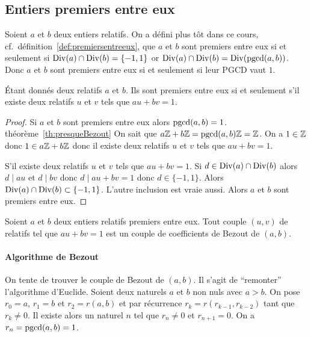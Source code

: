 \subsection{Entiers premiers entre eux}

Soient \(a\) et \(b\) deux entiers relatifs. On a défini plus tôt dans ce cours, 
cf.\ définition~\ref{def:premiersentreeux}, que \(a\) et \(b\) sont premiers entre eux si et 
seulement si \(\operatorname{Div}(a) \cap \operatorname{Div}(b)=\{-1,1\}\) or \(\operatorname{Div}(a) \cap \operatorname{Div}(b) = 
\operatorname{Div}(\operatorname{pgcd}(a,b))\). Donc \(a\) et \(b\) sont premiers entre eux si et seulement 
si leur PGCD vaut \(1\).

\begin{theo}
  Étant donnés deux relatifs \(a\) et \(b\). Ils sont premiers entre eux si et 
  seulement s'il existe deux relatifs \(u\) et \(v\) tels que \(au+bv=1\).
\end{theo}
\begin{proof}
  Si \(a\) et \(b\) sont premiers entre eux alors \(\operatorname{pgcd}(a,b) =1\). %
  théorème~\ref{th:presqueBezout}
  On sait que \(a\mathbb{Z}+b\mathbb{Z}=\operatorname{pgcd}(a,b)\mathbb{Z}=\mathbb{Z}\). On a \(1 \in \mathbb{Z}\) donc \(1 \in 
  a\mathbb{Z}+b\mathbb{Z}\) donc il existe deux relatifs \(u\) et \(v\) tels que \(au+bv=1\).

  S'il existe deux relatifs \(u\) et \(v\) tels que \(au+bv=1\). Si \(d \in 
  \operatorname{Div}(a) \cap \operatorname{Div}(b)\) alors \(d \mid au\) et \(d \mid bv\) donc \(d \mid 
  au+bv=1\) donc \(d \in \{-1,1\}\). Alors \(\operatorname{Div}(a) \cap \operatorname{Div}(b) \subset 
  \{-1,1\}\). L'autre inclusion est vraie aussi. Alors \(a\) et \(b\) sont 
  premiers entre eux.
\end{proof}

\begin{defdef}
  Soient \(a\) et \(b\) deux entiers relatifs premiers entre eux. Tout couple 
  \((u,v)\) de relatifs tel que \(au+bv=1\) est un couple de coefficients de 
  Bezout de \((a,b)\).
\end{defdef}

\paragraph{Algorithme de Bezout}

On tente de trouver le couple de Bezout de \((a,b)\). Il s'agit de ``remonter'' 
l'algorithme d'Euclide. Soient deux naturels \(a\) et \(b\) non nuls avec 
\(a>b\). On pose \(r_0=a\), \(r_1=b\) et \(r_2=r(a,b)\) et par récurrence 
\(r_k=r(r_{k-1}, r_{k-2})\) tant que \(r_k \neq 0\). Il existe alors un naturel 
\(n\) tel que \(r_n \neq 0\) et \(r_{n+1}=0\). On a \(r_n=\operatorname{pgcd}(a,b)=1\).

